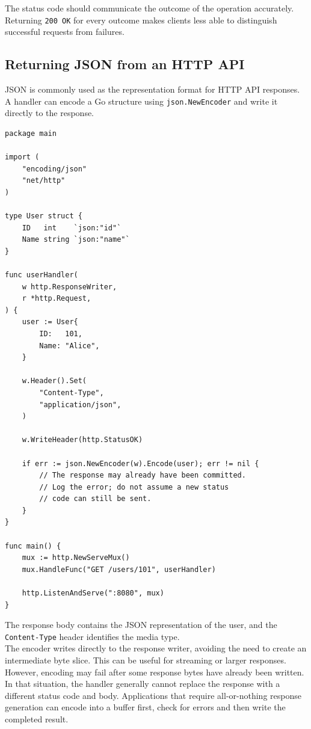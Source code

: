 The status code should communicate the outcome of the operation accurately. Returning \texttt{200 OK} for every outcome makes clients less able to distinguish successful requests from failures.\\

\subsection{Returning JSON from an HTTP API}

JSON is commonly used as the representation format for HTTP API responses. A handler can encode a Go structure using \texttt{json.NewEncoder} and write it directly to the response.

\begin{lstlisting}
package main

import (
    "encoding/json"
    "net/http"
)

type User struct {
    ID   int    `json:"id"`
    Name string `json:"name"`
}

func userHandler(
    w http.ResponseWriter,
    r *http.Request,
) {
    user := User{
        ID:   101,
        Name: "Alice",
    }

    w.Header().Set(
        "Content-Type",
        "application/json",
    )

    w.WriteHeader(http.StatusOK)

    if err := json.NewEncoder(w).Encode(user); err != nil {
        // The response may already have been committed.
        // Log the error; do not assume a new status
        // code can still be sent.
    }
}

func main() {
    mux := http.NewServeMux()
    mux.HandleFunc("GET /users/101", userHandler)

    http.ListenAndServe(":8080", mux)
}
\end{lstlisting}

The response body contains the JSON representation of the user, and the \texttt{Content-Type} header identifies the media type.\\

The encoder writes directly to the response writer, avoiding the need to create an intermediate byte slice. This can be useful for streaming or larger responses.\\

However, encoding may fail after some response bytes have already been written. In that situation, the handler generally cannot replace the response with a different status code and body. Applications that require all-or-nothing response generation can encode into a buffer first, check for errors and then write the completed result.\\

